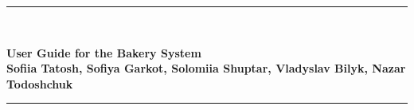 \begin{titlepage}

	\centering
    \vspace*{0.5 cm}
	\rule{\linewidth}{0.2 mm} \\[0.4cm]
	\begin{spacing}{1.1}
		\huge \bfseries User Guide for the Bakery System\\[0.3cm]
		\LARGE Sofiia Tatosh, Sofiya Garkot, Solomiia Shuptar, Vladyslav Bilyk, Nazar Todoshchuk
	\end{spacing}
	\rule{\linewidth}{0.2 mm} \\[1 cm]




 

	\clearpage

	

    \clearpage

\end{titlepage}

